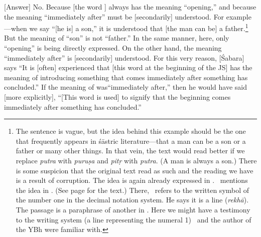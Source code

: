 [Answer] No.%
  Because [the word
\atha{}] always has the meaning ``opening,'' and because the
meaning ``immediately after'' must be [secondarily] understood.  For
example---when we say ``[he is] a son,'' it is understood that [the man can be] a father.\footnote{The sentence is vague, but the idea behind this example should be the one that frequently appears in śāstric literature---that a man can be a son or a father or many other things.  In that vein, the text would read better if we replace \emph{putra} with \emph{puruṣa} and \emph{pitṛ} with \emph{putra}. (A man is always a son.) There is some suspicion that the original text read as such and the reading we have is a result of corruption. The idea is again already expressed in .  \Sankara\ mentions the idea in .  (See page \pageref{PTRPITR} for the text.)  There, \Sankara\ refers to the written symbol of the number one in the decimal notation system.  He says it is a line (\emph{rekhā}).  The passage is a paraphrase of another in .  Here we might have a testimony to the writing system (a line representing the numeral 1) \Sankara\ and the author of the YBh were familiar with.}  But the meaning of ``son'' is not ``father.''  In the same
manner, here, only ``opening'' is being directly expressed.  On the other
hand, the meaning ``immediately after'' is [secondarily] understood.
For this very reason, [Śabara] says ``It is [often] experienced that
[this word \atha{} at the beginning of the JS] has the meaning of
introducing something that comes immediately after something has concluded.''  If the
meaning of \atha{} was``immediately after,'' then he would have
said [more explicitly], ``[This word \atha{} is used] to signify
that the beginning comes immediately after something has concluded.''

